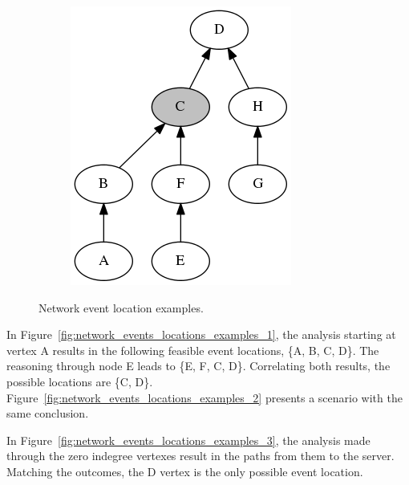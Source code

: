 \begin{figure}[H]
{\begin{subfigure}[b]{0.3\textwidth}
            \includegraphics[width=\textwidth]{./figures/methodology/spatial_time_correlation/event_tree_graph_4.png}
            \caption{}\label{fig:network_events_locations_examples_4}
        \end{subfigure}%
    }
    \caption{Network event location examples.}
\label{fig:network_events_locations_examples}
\end{figure}%

In Figure~\ref{fig:network_events_locations_examples_1}, the analysis
starting at vertex A results in the following feasible event locations,
\{A, B, C, D\}. The reasoning through node E leads to
\{E, F, C, D\}. Correlating both results, the possible locations are \{C, D\}.
Figure~\ref{fig:network_events_locations_examples_2} presents a scenario with
the same conclusion.

In Figure~\ref{fig:network_events_locations_examples_3}, the analysis made
through the zero indegree vertexes result in the paths from them to the server.
Matching the outcomes, the D vertex is the only possible event location.

